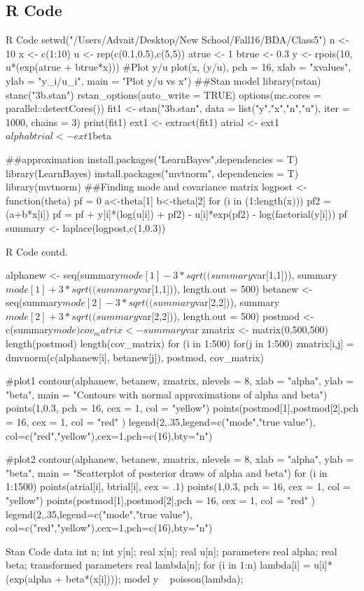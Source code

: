 \documentclass{article}
\begin{document}
\subsection{R Code}
\begin{sexylisting}{R Code}
setwd("/Users/Advait/Desktop/New School/Fall16/BDA/Class5")
n <- 10
x <- c(1:10)
u <- rep(c(0.1,0.5),c(5,5))
atrue <- 1
btrue <- 0.3
y <- rpois(10, u*(exp(atrue + btrue*x)))
#Plot y/u
plot(x, (y/u), pch = 16, xlab = "xvalues", ylab = "y_i/u_i", 
main = "Plot y/u vs x")
##Stan model
library(rstan)
stanc("3b.stan")
rstan_options(auto_write = TRUE)
options(mc.cores = parallel::detectCores())
fit1 <- stan("3b.stan", data = list("y","x","n","u"), 
                  iter = 1000, chains = 3)
print(fit1)
ext1 <- extract(fit1)
atrial <- ext1$alpha
btrial <- ext1$beta

##approximation
install.packages("LearnBayes",dependencies = T)
library(LearnBayes)
install.packages("mvtnorm", dependencies = T)
library(mvtnorm)
##Finding mode and covariance matrix
logpost <-function(theta){ 
  pf = 0
a<-theta[1]
b<-theta[2]
for (i in (1:length(x))){
  pf2 = (a+b*x[i])
  pf = pf + y[i]*(log(u[i]) + pf2) - u[i]*exp(pf2) - 
         log(factorial(y[i]))
}                                           
pf}
summary <- laplace(logpost,c(1,0.3))
\end{sexylisting}
\begin{sexylisting}{R Code contd.}

alphanew <- seq(summary$mode[1] - 
                           3*sqrt((summary$var[1,1])),
                           summary$mode[1] + 
                           3*sqrt((summary$var[1,1])),
                           length.out = 500)
betanew <- seq(summary$mode[2] - 
                          3*sqrt((summary$var[2,2])),
                          summary$mode[2] + 
                          3*sqrt((summary$var[2,2])),
                          length.out = 500)
postmod <- c(summary$mode)
cov_matrix <- summary$var
zmatrix <- matrix(0,500,500)
length(postmod)
length(cov_matrix)
for (i in 1:500){
  for(j in 1:500){
  zmatrix[i,j] =  dmvnorm(c(alphanew[i], betanew[j]), 
                                          postmod, cov_matrix)}}
                                          
#plot1
contour(alphanew, betanew, zmatrix, nlevels = 8,  
        xlab = "alpha", ylab = "beta", 
       main = "Contours with normal approximations of alpha and beta")
points(1,0.3, pch = 16, cex = 1, col = "yellow")
points(postmod[1],postmod[2],pch = 16, cex = 1, col = "red" )
legend(2,.35,legend=c("mode","true value"),
col=c("red","yellow"),cex=1,pch=c(16),bty="n")

#plot2
contour(alphanew, betanew, zmatrix, nlevels = 8, 
        xlab = "alpha", ylab = "beta", 
        main = "Scatterplot of posterior draws of alpha and beta")
for (i in 1:1500){
  points(atrial[i], btrial[i], cex = .1)
}
points(1,0.3, pch = 16, cex = 1, col = "yellow")
points(postmod[1],postmod[2],pch = 16, cex = 1, col = "red" )
legend(2,.35,legend=c("mode","true value"),
       col=c("red","yellow"),cex=1,pch=c(16),bty="n")
\end{sexylisting}
\begin{sexylisting}{Stan Code}
data{
int n;
int y[n];
real x[n]; 
real u[n];
}
parameters{
real alpha; 
real beta; 
}
transformed parameters{
  real lambda[n];
  for (i in 1:n)
 lambda[i] = u[i]*(exp(alpha + beta*(x[i])));
 }
model{
y ~ poisson(lambda);
}
\end{sexylisting}
\end{document}
